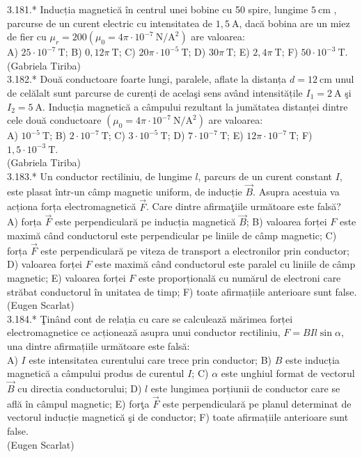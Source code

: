 3.181.* Inducția magnetică în centrul unei bobine cu 50 spire, lungime $5 \mathrm{~cm}$ , parcurse de un curent electric cu intensitatea de $1,5 \mathrm{~A}$, dacă bobina are un miez de fier cu $\mu_{r}=200\left(\mu_{0}=4 \pi \cdot 10^{-7} \mathrm{~N} / \mathrm{A}^{2}\right)$ are valoarea:\\ A) $25 \cdot 10^{-7} \mathrm{~T}$; B) $0,12 \pi \mathrm{~T}$; C) $20 \pi \cdot 10^{-5} \mathrm{~T}$; D) $30 \pi \mathrm{~T}$; E) $2,4 \pi \mathrm{~T}$; F) $50 \cdot 10^{-3} \mathrm{~T}$.\\ (Gabriela Tiriba)\\

3.182.* Două conductoare foarte lungi, paralele, aflate la distanța $d=12 \mathrm{~cm}$ unul de celălalt sunt parcurse de curenți de acelaşi sens având intensitățile $I_{1}=2 \mathrm{~A}$ şi $I_{2}=5 \mathrm{~A}$. Inducția magnetică a câmpului rezultant la jumătatea distanței dintre cele două conductoare $\left(\mu_{0}=4 \pi \cdot 10^{-7} \mathrm{~N} / \mathrm{A}^{2}\right)$ are valoarea:\\ A) $10^{-5} \mathrm{~T}$; B) $2 \cdot 10^{-7} \mathrm{~T}$; C) $3 \cdot 10^{-5} \mathrm{~T}$; D) $7 \cdot 10^{-7} \mathrm{~T}$; E) $12 \pi \cdot 10^{-7} \mathrm{~T}$; F) $1,5 \cdot 10^{-3} \mathrm{~T}$.\\ (Gabriela Tiriba)\\

3.183.* Un conductor rectiliniu, de lungime $l$, parcurs de un curent constant $I$, este plasat într-un câmp magnetic uniform, de inducție $\vec{B}$. Asupra acestuia va acționa forța electromagnetică $\vec{F}$. Care dintre afirmaţiile următoare este falsă?\\ A) forța $\vec{F}$ este perpendiculară pe inducția magnetică $\vec{B}$; B) valoarea forței $F$ este maximă când conductorul este perpendicular pe liniile de câmp magnetic; C) forța $\vec{F}$ este perpendiculară pe viteza de transport a electronilor prin conductor; D) valoarea forței $F$ este maximă când conductorul este paralel cu liniile de câmp magnetic; E) valoarea forței $F$ este proporțională cu numărul de electroni care străbat conductorul în unitatea de timp; F) toate afirmațiile anterioare sunt false.\\ (Eugen Scarlat)\\

3.184.* Ţinând cont de relația cu care se calculează mărimea forței electromagnetice ce acționează asupra unui conductor rectiliniu, $F=B I l \sin \alpha$, una dintre afirmațiile următoare este falsă:\\ A) $I$ este intensitatea curentului care trece prin conductor; B) $B$ este inducția magnetică a câmpului produs de curentul $I$; C) $\alpha$ este unghiul format de vectorul $\vec{B}$ cu directia conductorului; D) $l$ este lungimea porțiunii de conductor care se află în câmpul magnetic; E) forţa $\vec{F}$ este perpendiculară pe planul determinat de vectorul inducție magnetică şi de conductor; F) toate afirmațiile anterioare sunt false.\\ (Eugen Scarlat)\\

